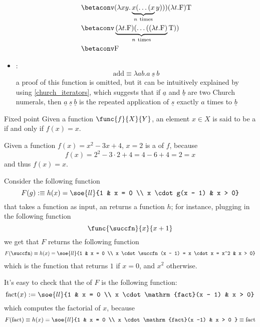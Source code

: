 \documentclass[a4paper, 12pt]{report}
\begin{document}
\begin{itemize}
\begin{equation*}
\begin{split}
                                                &\betaconv (\lambda xy. \underbrace{x ( \ldots ( x}_{n \ \mathrm{times}}y))) (\lambda t.\mathrm F)\mathrm T \\
                                                &\betaconv \underbrace{(\lambda t.\mathrm F)(\ldots ((\lambda t.\mathrm F)}_{n \ \mathrm{times}} \mathrm T)) \\
                                                &\betaconv \mathrm F
                \end{split}
            \end{equation*}
        \item {}: $$\mathrm{add} \equiv \lambda ab.a \ \underline s \ b$$ a proof of this function is omitted, but it can be intuitively explained by using \cref{church_iterators}, which suggests that if $\underline a$ and $\underline b$ are two Church numerals, then $\underline a \ \underline s \ \underline b$ is the repeated application of $\underline s$ exactly $a$ times to $\underline b$
    \end{itemize}

    \begin{frameddefn}{Fixed point}
        Given a function $\func{f}{X}{Y}$, an element $x \in X$ is said to be a  if and only if $f(x) = x$.
    \end{frameddefn}

    \begin{example}
        Given a function $f(x) = x^2 - 3x + 4$, $x = 2$ is a  of $f$, because $$f(x) = 2^2 - 3 \cdot 2 + 4 = 4 - 6 + 4 = 2 = x$$ and thus $f(x) = x$.
    \end{example}

    \begin{example}
        Consider the following function $$F(g) :\equiv h(x) = \soe{ll}{1 & x = 0 \\ x \cdot g(x - 1) & x > 0}$$ that takes a function as input, an returns a function $h$; for instance, plugging in the following function $$\func{\succfn}{x}{x + 1}$$ we get that $F$ returns the following function $$F(\succfn) \equiv h(x) = \soe{ll}{1 & x = 0 \\ x \cdot \succfn(x - 1) = x \cdot x = x^2 & x > 0}$$ which is the function that returns $1$ if $x = 0$, and $x^2$ otherwise.

        It's easy to check that the  of $F$ is the following function: $$\mathrm{fact}(x) := \soe{ll}{1 & x = 0 \\ x \cdot \mathrm{fact}(x - 1) & x > 0}$$ which computes the factorial of $x$, because $$F(\mathrm{fact}) \equiv h(x) = \soe{ll}{1 & x = 0 \\ x \cdot \mathrm{fact}(x -1) & x > 0 } \equiv \mathrm{fact}$$
    \end{example}
\end{document}

